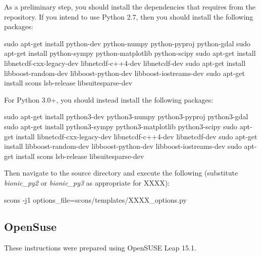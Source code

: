 \noindent As a preliminary step, you should install the dependencies that \esfinley requires from the repository.
If you intend to use Python 2.7, then you should install the following packages:
\begin{shellCode}
sudo apt-get install python-dev python-numpy python-pyproj python-gdal
sudo apt-get install python-sympy python-matplotlib python-scipy
sudo apt-get install libnetcdf-cxx-legacy-dev libnetcdf-c++4-dev libnetcdf-dev
sudo apt-get install libboost-random-dev libboost-python-dev libboost-iostreams-dev
sudo apt-get install scons lsb-release libsuitesparse-dev
\end{shellCode}

For Python 3.0+, you should instead install the following packages:
\begin{shellCode}
sudo apt-get install python3-dev python3-numpy python3-pyproj python3-gdal
sudo apt-get install python3-sympy python3-matplotlib python3-scipy
sudo apt-get install libnetcdf-cxx-legacy-dev libnetcdf-c++4-dev libnetcdf-dev
sudo apt-get install libboost-random-dev libboost-python-dev libboost-iostreams-dev
sudo apt-get install scons lsb-release libsuitesparse-dev
\end{shellCode}


\noindent Then navigate to the source directory and execute the following (substitute \textit{bionic_py2} or \textit{bionic_py3} as appropriate for XXXX):
\begin{shellCode}
scons -j1 options_file=scons/templates/XXXX_options.py
\end{shellCode}




\subsection{OpenSuse}\label{sec:susesrc}
These instructions were prepared using OpenSUSE Leap 15.1. \newline

